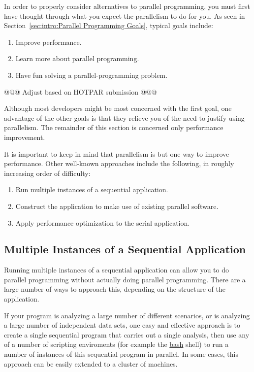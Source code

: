 In order to properly consider alternatives to parallel programming,
you must first have thought through what you expect the parallelism
to do for you.
As seen in Section~\ref{sec:intro:Parallel Programming Goals},
typical goals include:

\begin{enumerate}
\item	Improve performance.
\item	Learn more about parallel programming.
\item	Have fun solving a parallel-programming problem.
\end{enumerate}

@@@ Adjust based on HOTPAR submission @@@

Although most developers might be most concerned with the first goal,
one advantage of the other goals is that they relieve you of the need
to justify using parallelism.
The remainder of this section is concerned only performance improvement.

It is important to keep in mind that parallelism is but one way to
improve performance.
Other well-known approaches include the following, in roughly increasing
order of difficulty:

\begin{enumerate}
\item	Run multiple instances of a sequential application.
\item	Construct the application to make use of existing parallel software.
\item	Apply performance optimization to the serial application.
\end{enumerate}

\subsection{Multiple Instances of a Sequential Application}
\label{sec:intro:Multiple Instances of a Sequential Application}

Running multiple instances of a sequential application can allow you
to do parallel programming without actually doing parallel programming.
There are a large number of ways to approach this, depending on the
structure of the application.

If your program is analyzing a large number of different scenarios,
or is analyzing a large number of independent data sets, one easy
and effective approach is to create a single sequential program that
carries out a single analysis, then use any of a number of scripting
enviroments (for example the \url{bash} shell) to run a number of
instances of this sequential program in parallel.
In some cases, this approach can be easily extended to a cluster of
machines.

